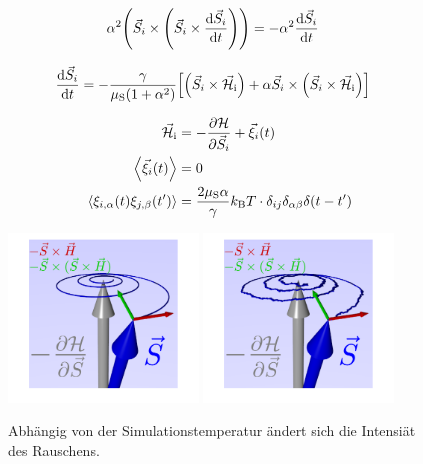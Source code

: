 \documentclass[main.tex]{subfiles}
\begin{document}
\begin{align}
	\alpha^2 \qty(\vec{S}_i \times \qty(\vec{S}_i \times
	\dv{\vec{S}_i}{t})) & = -\alpha^2\dv{\vec{S}_i}{t}
\end{align}

\begin{align}
	\dv{\vec{S}_i}{t} & = -\frac{\gamma
	}{\mu_{\text{S}}(1+\alpha^2)}\qty[\qty(\vec{S}_i \times
		\vec{\mathcal{H}}_{\text{i}}) + \alpha \vec{S}_i \times
		\qty(\vec{S}_i \times
		\vec{\mathcal{H}}_{\text{i}})]
\end{align}


\begin{align}
	\vec{\mathcal{H}}_{\text{i}}                 & =
	-\pdv{\mathcal{H}}{\vec{S}_i} +
	\vec{\xi}_i(t)
	\\
	\expval{\vec{\xi}_i(t)}                      & = 0
	\\
	\expval{\xi_{i,\alpha}(t) \xi_{j,\beta}(t')} & = \frac{2\mu_\text{S}
		\alpha
	}{\gamma}k_\text{B} T \cdot \delta_{ij} \delta_{\alpha \beta}
	\delta(t-t')
\end{align}

\begin{figure}[H]
	\centering
	{\includegraphics[width=0.45\textwidth]{bilder/jschlege/LLG_T0_labeled.png}}
	{\includegraphics[width=0.45\textwidth]{bilder/jschlege/LLG_labeled.png}}
	\caption{Abhängig von der Simulationstemperatur ändert sich die Intensiät des Rauschens.\cite{schlegel-master}}
	\label{fig:llg-rauschen}
\end{figure}
\end{document}
